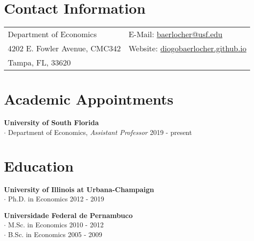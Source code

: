 \documentclass[mm, 10pt]{simple_style}
\begin{document}
\version{\today}


\begin{resume}


\section{Contact Information} 

\begin{longtable}{p{2.5in}p{3in}}
Department of Economics & E-Mail: \url{baerlocher@usf.edu} \\
4202 E. Fowler Avenue, CMC342 & Website: \url{diogobaerlocher.github.io} \\
Tampa, FL, 33620 & \\
\end{longtable}




\section{Academic Appointments}

\textbf{University of South Florida}  \\
$\cdot$ Department of Economics, \emph{Assistant Professor} \hfill 2019 - present 



\section{Education}

\textbf{University of Illinois at Urbana-Champaign} \\
$\cdot$ Ph.D. in Economics \hfill 2012 - 2019 

\textbf{Universidade Federal de Pernambuco} \\
$\cdot$ M.Sc. in Economics \hfill 2010 - 2012 \\
$\cdot$ B.Sc. in Economics \hfill 2005 - 2009 \\



\end{resume}
\end{document}
